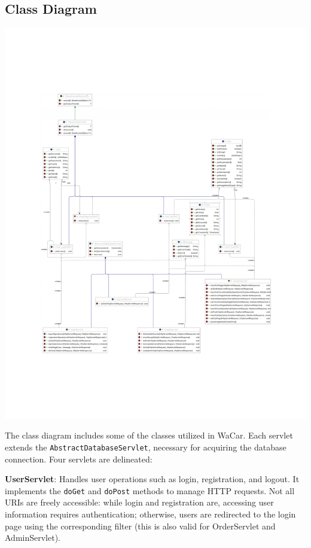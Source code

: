 \subsection{Class Diagram}
\begin{center}
	\includegraphics[scale=0.65]{ClassDiagram.pdf}
	\label{ERSchema}
\end{center}

The class diagram includes some of the classes utilized in WaCar. Each servlet extends the \texttt{AbstractDatabaseServlet}, necessary for acquiring the database connection. Four servlets are delineated:

\textbf{UserServlet}: Handles user operations such as login, registration, and logout. It implements the \texttt{doGet} and \texttt{doPost} methods to manage HTTP requests. Not all URIs are freely accessible: while login and registration are, accessing user information requires authentication; otherwise, users are redirected to the login page using the corresponding filter (this is also valid for OrderServlet and AdminServlet).

